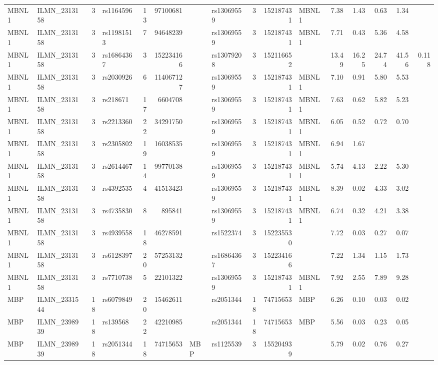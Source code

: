 \documentclass{article}
\begin{document}
\begin{landscape}
{\begin{ThreePartTable}
\begin{longtable}{|llr|lrrl|lrrl|rrrr|r|}
  MBNL1 & ILMN\_2313158 & 3 & rs1164596 & 13 & 97100681 &  & rs13069559 & 3 & 152187431 & MBNL1 & 7.38 & 1.43 & 0.63 & 1.34 &  \\
  MBNL1 & ILMN\_2313158 & 3 & rs11981513 & 7 & 94648239 &  & rs13069559 & 3 & 152187431 & MBNL1 & 7.71 & 0.43 & 5.36 & 4.58 &  \\
  MBNL1 & ILMN\_2313158 & 3 & rs16864367 & 3 & 152234166 &  & rs13079208 & 3 & 152116652 &  & 13.49 & 16.25 & 24.74 & 41.56 & 0.118 \\
  MBNL1 & ILMN\_2313158 & 3 & rs2030926 & 6 & 114067127 &  & rs13069559 & 3 & 152187431 & MBNL1 & 7.10 & 0.91 & 5.80 & 5.53 &  \\
  MBNL1 & ILMN\_2313158 & 3 & rs218671 & 17 & 6604708 &  & rs13069559 & 3 & 152187431 & MBNL1 & 7.63 & 0.62 & 5.82 & 5.23 &  \\
  MBNL1 & ILMN\_2313158 & 3 & rs2213360 & 22 & 34291750 &  & rs13069559 & 3 & 152187431 & MBNL1 & 6.05 & 0.52 & 0.72 & 0.70 &  \\
  MBNL1 & ILMN\_2313158 & 3 & rs2305802 & 19 & 16038535 &  & rs13069559 & 3 & 152187431 & MBNL1 & 6.94 & 1.67 &  &  &  \\
  MBNL1 & ILMN\_2313158 & 3 & rs2614467 & 14 & 99770138 &  & rs13069559 & 3 & 152187431 & MBNL1 & 5.74 & 4.13 & 2.22 & 5.30 &  \\
  MBNL1 & ILMN\_2313158 & 3 & rs4392535 & 4 & 41513423 &  & rs13069559 & 3 & 152187431 & MBNL1 & 8.39 & 0.02 & 4.33 & 3.02 &  \\
  MBNL1 & ILMN\_2313158 & 3 & rs4735830 & 8 & 895841 &  & rs13069559 & 3 & 152187431 & MBNL1 & 6.74 & 0.32 & 4.21 & 3.38 &  \\
  MBNL1 & ILMN\_2313158 & 3 & rs4939558 & 18 & 46278591 &  & rs1522374 & 3 & 152235530 &  & 7.72 & 0.03 & 0.27 & 0.07 &  \\
  MBNL1 & ILMN\_2313158 & 3 & rs6128397 & 20 & 57253132 &  & rs16864367 & 3 & 152234166 &  & 7.22 & 1.34 & 1.15 & 1.73 &  \\
  MBNL1 & ILMN\_2313158 & 3 & rs7710738 & 5 & 22101322 &  & rs13069559 & 3 & 152187431 & MBNL1 & 7.92 & 2.55 & 7.89 & 9.28 &  \\
  MBP & ILMN\_2331544 & 18 & rs6079849 & 20 & 15462611 &  & rs2051344 & 18 & 74715653 & MBP & 6.26 & 0.10 & 0.03 & 0.02 &  \\
  MBP & ILMN\_2398939 & 18 & rs139568 & 22 & 42210985 &  & rs2051344 & 18 & 74715653 & MBP & 5.56 & 0.03 & 0.23 & 0.05 &  \\
  MBP & ILMN\_2398939 & 18 & rs2051344 & 18 & 74715653 & MBP & rs1125539 & 3 & 155204939 &  & 5.79 & 0.02 & 0.76 & 0.27 &  \\

\end{longtable}
\end{ThreePartTable}}
\end{landscape}
\end{document}
